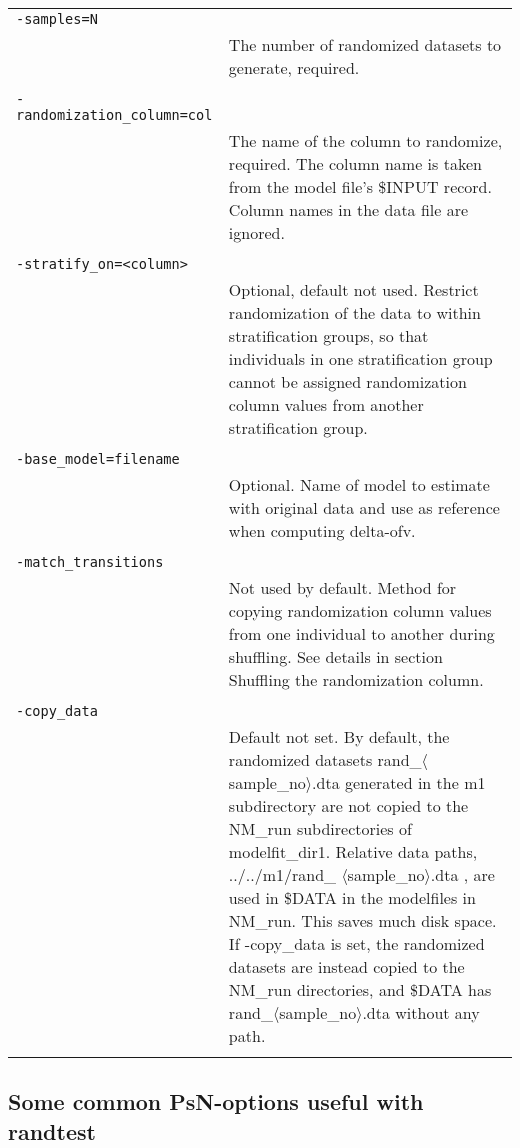 \documentclass[a4paper,12pt]{article}
\begin{document}
\begin{longtable}{p{1in}p{4in}}
\verb|-samples=N| & \\
\nopagebreak
 & The number of randomized datasets to generate, required. \\
\\
\verb|-randomization_column=col| & \\
\nopagebreak
 & The name of the column to randomize, required. The column name is taken from the model file's \$INPUT record. Column names in the data file are ignored. \\
\\
\verb|-stratify_on=<column>| & \\
\nopagebreak
 & Optional, default not used. Restrict randomization of the data to within stratification groups, so that individuals in one stratification group cannot be assigned randomization column values from another stratification group. \\
\\
\verb|-base_model=filename| & \\
\nopagebreak
 & Optional. Name of model to estimate with original data and use as reference when computing delta-ofv. \\
\\
\verb|-match_transitions| & \\
\nopagebreak
 & Not used by default. Method for copying randomization column values from one individual to another during shuffling. See details in section Shuffling the randomization column.     \\
\\
\verb|-copy_data| & \\
\nopagebreak
 & Default not set. By default, the randomized datasets rand\_$\langle$sample\_no$\rangle$.dta generated in the m1 subdirectory are not copied to the NM\_run subdirectories of modelfit\_dir1. Relative data paths, ../../m1/rand\_ $\langle$sample\_no$\rangle$.dta , are used in \$DATA in the modelfiles in NM\_run. This saves much disk space. If \mbox{-copy\_data} is set, the randomized datasets are instead copied to the NM\_run directories, and \$DATA has  rand\_$\langle$sample\_no$\rangle$.dta without any path. \\
\\
\end{longtable}

\subsection{Some common PsN-options useful with randtest}
\end{document}
